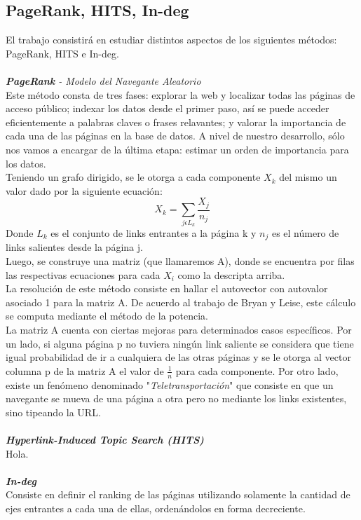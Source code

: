 \documentclass[a4paper]{article}
\begin{document}
\subsection{PageRank, HITS, In-deg}
El trabajo consistir\'a en estudiar distintos aspectos de los siguientes m\'etodos: PageRank,
HITS e In-deg. \\
\\
\indent \indent \emph{\textbf{PageRank} - Modelo del Navegante Aleatorio} \\
\indent Este m\'etodo consta de tres fases: explorar la web y localizar todas las p\'aginas de acceso p\'ublico; indexar los datos desde el primer paso, as\'i se puede acceder eficientemente a palabras claves o frases relavantes; y valorar la importancia de cada una de las p\'aginas en la base de datos. A nivel de nuestro desarrollo, s\'olo nos vamos a encargar de la \'ultima etapa: estimar un orden de importancia para los datos.\\
\indent Teniendo un grafo dirigido, se le otorga a cada componente $X_k$ del mismo un valor dado por la siguiente ecuaci\'on:
\[
 X_k = \sum_{j \epsilon L_k} \frac{X_j}{n_j}
\]
Donde\emph{ $L_k$} es el conjunto de links entrantes a la p\'agina k y \emph{$n_j$} es el n\'umero de links salientes desde la p\'agina j.\\
\indent Luego, se construye una matriz (que llamaremos A), donde se encuentra por filas las respectivas ecuaciones para cada $X_i$ como la descripta arriba.\\
\indent La resoluci\'on de este m\'etodo consiste en hallar el autovector con autovalor asociado 1 para la matriz A. De acuerdo al trabajo de Bryan y Leise, este c\'alculo se computa mediante el m\'etodo de la potencia. \\
\indent La matriz A cuenta con ciertas mejoras para determinados casos espec\'ificos. Por un lado, si alguna p\'agina p no tuviera ning\'un link saliente se considera que tiene igual probabilidad de ir a cualquiera de las otras p\'aginas y se le otorga al vector columna p de la matriz A el valor de $\frac{1}{n}$ para cada componente. Por otro lado, existe un fen\'omeno denominado "\textit{Teletransportaci\'on}" que consiste en que un navegante se mueva de una p\'agina a otra pero no mediante los links existentes, sino tipeando la URL.  \\
\\
\indent \indent \emph{\textbf{Hyperlink-Induced Topic Search (HITS)}} \\
\indent Hola. \\
\\
\indent \indent \emph{\textbf{In-deg}} \\
\indent Consiste en definir el ranking de las p\'aginas utilizando solamente la cantidad de ejes entrantes a cada una de ellas, orden\'andolos en forma decreciente.\\
\end{document}
